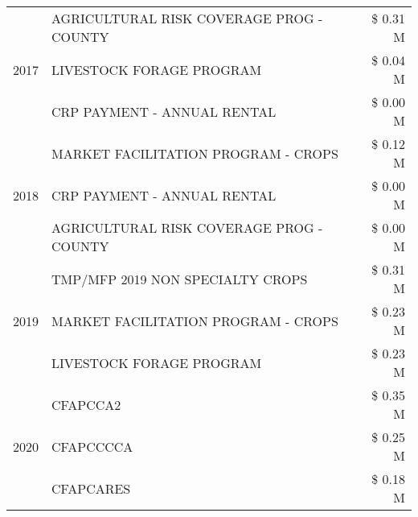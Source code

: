 \begin{tabular}{llr}
\cline{1-3}
\multirow[t]{3}{*}{2017} & AGRICULTURAL RISK COVERAGE PROG - COUNTY & \$ 0.31 M \\
 & LIVESTOCK FORAGE PROGRAM & \$ 0.04 M \\
 & CRP PAYMENT - ANNUAL RENTAL & \$ 0.00 M \\
\cline{1-3}
\multirow[t]{3}{*}{2018} & MARKET FACILITATION PROGRAM - CROPS & \$ 0.12 M \\
 & CRP PAYMENT - ANNUAL RENTAL & \$ 0.00 M \\
 & AGRICULTURAL RISK COVERAGE PROG - COUNTY & \$ 0.00 M \\
\cline{1-3}
\multirow[t]{3}{*}{2019} & TMP/MFP 2019 NON SPECIALTY CROPS & \$ 0.31 M \\
 & MARKET FACILITATION PROGRAM - CROPS & \$ 0.23 M \\
 & LIVESTOCK FORAGE PROGRAM & \$ 0.23 M \\
\cline{1-3}
\multirow[t]{3}{*}{2020} & CFAPCCA2 & \$ 0.35 M \\
 & CFAPCCCCA & \$ 0.25 M \\
 & CFAPCARES & \$ 0.18 M \\
\cline{1-3}
\bottomrule
\end{tabular}

